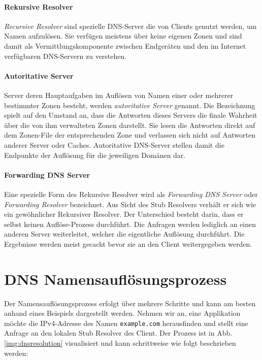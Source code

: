 \paragraph{Rekursive Resolver}
\textit{Recursive Resolver} sind spezielle DNS-Server die von Clients genutzt werden, um Namen aufzulösen. Sie verfügen meistens über keine eigenen Zonen und sind damit als Vermittlungskomponente zwischen Endgeräten und den im Internet verfügbaren DNS-Servern zu verstehen.

\paragraph{Autoritative Server}
Server deren Hauptaufgaben im Auflösen von Namen einer oder mehrerer bestimmter Zonen besteht, werden \textit{autoritative Server} genannt. Die Bezeichnung spielt auf den Umstand an, dass die Antworten dieses Servers die finale Wahrheit über die von ihm verwalteten Zonen darstellt. Sie lesen die Antworten direkt auf dem Zonen-File der entsprechenden Zone und verlassen sich nicht auf Antworten anderer Server oder Caches. Autoritative DNS-Server stellen damit die Endpunkte der Auflösung für die jeweiligen Domänen dar.

\paragraph{Forwarding DNS Server}
Eine spezielle Form des Rekursive Resolver wird als \textit{Forwarding DNS Server} oder \textit{Forwarding Resolver} bezeichnet. Aus Sicht des Stub Resolvers verhält er sich wie ein gewöhnlicher Rekursiver Resolver. Der Unterschied besteht darin, dass er selbst keinen Auflöse-Prozess durchführt. Die Anfragen werden lediglich an einen anderen Server weiterleitet, welcher die eigentliche Auflösung durchführt. Die Ergebnisse werden meist gecacht bevor sie an den Client weitergegeben werden.

\section{DNS Namensauflösungsprozess}
\label{sec:dnsresolution}
Der Namensauflösungsprozess erfolgt über mehrere Schritte und kann am besten anhand eines Beispiels dargestellt werden. Nehmen wir an, eine Applikation möchte die IPv4-Adresse des Namen \texttt{example.com} herausfinden und stellt eine Anfrage an den lokalen Stub Resolver des Client. Der Prozess ist in Abb. \ref{img:dnsresolution} visualisiert und kann schrittweise wie folgt beschrieben werden:

